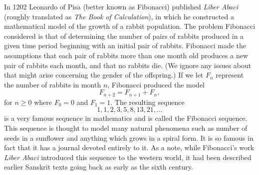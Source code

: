  \label{sec:diagonalization}

\vspace*{-17 pt}


In 1202 Leonardo of Pisa (better known as Fibonacci) published \emph{Liber Abaci} (roughly translated as \emph{The Book of Calculation}), in which he constructed a mathematical model of the growth of a rabbit population. The problem Fibonacci considered is that of determining the number of pairs of rabbits produced in a given time period beginning with an initial pair of rabbits. Fibonacci made the assumptions that each pair of rabbits more than one month old produces a new pair of rabbits each month, and that no rabbits die. (We ignore any issues about that might arise concerning the gender of the offspring.) If we let $F_n$ represent the number of rabbits in month $n$, Fibonacci produced the model
\begin{equation}
F_{n+2} = F_{n+1} + F_{n}, \label{eq:Fibonacci}
\end{equation}
for $n \geq 0$ where $F_0 = 0$ and $F_1 = 1$. The resulting sequence 
\[1,1,2,3,5,8,13,21, \ldots\]
is a very famous sequence in mathematics and is called the Fibonacci sequence. This sequence is thought to model many natural phenomena such as number of seeds in a sunflower and anything which grows in a spiral form. It is so famous in fact that it has a journal devoted entirely to it. As a note, while Fibonacci's work \emph{Liber Abaci} introduced this sequence to the western world, it had been described earlier Sanskrit texts going back as early as the sixth century. 

